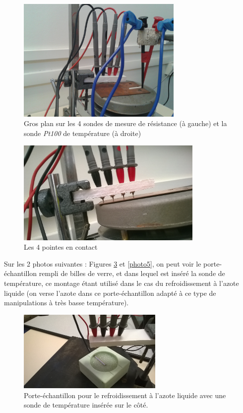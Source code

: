 \newpage

\begin{figure}[!t]
  \begin{center}
		\includegraphics[width=8cm]{./images/photo2.jpg}
		\caption{Gros plan sur les 4 sondes de mesure de résistance (à gauche) et la sonde \emph{Pt100} de température (à droite)}
		\label{photo2}
	\end{center}
\end{figure}
\begin{figure}[h]
  \begin{center}
		\includegraphics[width=9cm]{./images/photo3.jpg}
		\caption{Les 4 pointes en contact}
		\label{photo3}
	\end{center}
\end{figure}

Sur les 2 photos suivantes : Figures \ref{photo4} et \ref{photo5}, on peut voir le porte-échantillon rempli de billes de verre, et dans lequel est inséré la sonde de température, ce montage étant utilisé dans le cas du refroidissement à l'azote liquide (on verse l'azote dans ce porte-échantillon adapté à ce type de manipulations à très basse température).

\newpage

\begin{figure}[!t]
  \begin{center}
		\includegraphics[width=7cm]{./images/photo4.jpg}
		\caption{Porte-échantillon pour le refroidissement à l'azote liquide avec une sonde de température insérée sur le côté.}
		\label{photo4}
	\end{center}
\end{figure}

